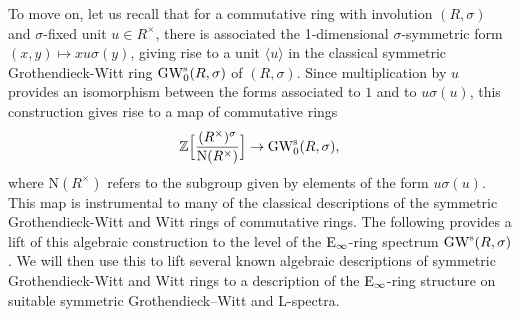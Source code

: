 To move on, let us recall that for a commutative ring with involution $(R,\sigma)$ and $\sigma$-fixed unit $u \in R^\times$, there is associated the 1-dimensional $\sigma$-symmetric form $(x,y) \mapsto xu\sigma(y)$, giving rise to a unit $\langle u \rangle$ in the classical symmetric Grothendieck-Witt ring $\operatorname{GW}_0^{\mathrm{s}}(R,\sigma)$ of $(R,\sigma)$. Since multiplication by $u$ provides an isomorphism between the forms associated to $1$ and to $u\sigma(u)$, this construction gives rise to a map of commutative rings 
\[
\mathbb{Z}\Bigl[\frac{(R^\times)^\sigma}{\mathrm{N}(R^\times)}\Bigr] \to \operatorname{GW}_0^{\mathrm{s}}(R,\sigma),
\]
where $\mathrm{N}(R^\times)$
refers to the subgroup given by elements of the form $u\sigma(u)$. This map is instrumental to many of the classical descriptions of the symmetric Grothendieck-Witt and Witt rings of commutative rings. The following provides a lift of this algebraic construction to the level of the ${\mathrm{E}_{\infty}}$-ring spectrum $\operatorname{GW}^{\mathrm{s}}(R,\sigma)$. We will then use this to lift several known algebraic descriptions of 
symmetric Grothendieck-Witt and Witt rings
to a description of the ${\mathrm{E}_{\infty}}$-ring structure on suitable symmetric Grothendieck--Witt and L-spectra.

